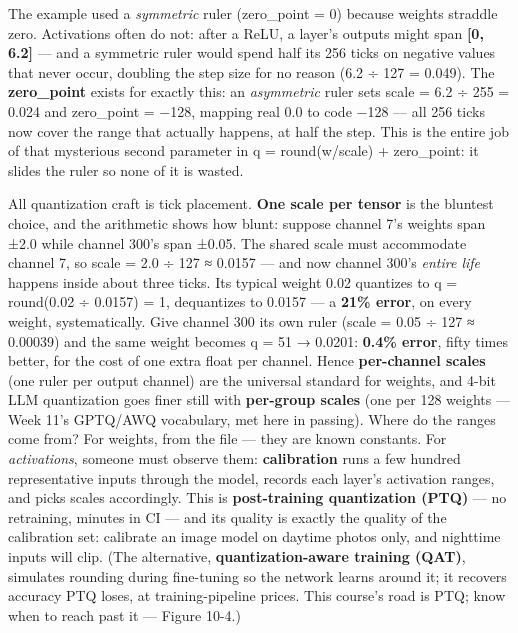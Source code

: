 The example used a \textit{symmetric} ruler (zero\_point = 0) because weights straddle zero. Activations often do not: after a ReLU, a layer's outputs might span \textbf{[0, 6.2]} — and a symmetric ruler would spend half its 256 ticks on negative values that never occur, doubling the step size for no reason (6.2 ÷ 127 = 0.049). The \textbf{zero\_point} exists for exactly this: an \textit{asymmetric} ruler sets scale = 6.2 ÷ 255 = 0.024 and zero\_point = −128, mapping real 0.0 to code −128 — all 256 ticks now cover the range that actually happens, at half the step. This is the entire job of that mysterious second parameter in q = round(w/scale) + zero\_point: it slides the ruler so none of it is wasted.

All quantization craft is tick placement. \textbf{One scale per tensor} is the bluntest choice, and the arithmetic shows how blunt: suppose channel 7's weights span ±2.0 while channel 300's span ±0.05. The shared scale must accommodate channel 7, so scale = 2.0 ÷ 127 ≈ 0.0157 — and now channel 300's \textit{entire life} happens inside about three ticks. Its typical weight 0.02 quantizes to q = round(0.02 ÷ 0.0157) = 1, dequantizes to 0.0157 — a \textbf{21\% error}, on every weight, systematically. Give channel 300 its own ruler (scale = 0.05 ÷ 127 ≈ 0.00039) and the same weight becomes q = 51 → 0.0201: \textbf{0.4\% error}, fifty times better, for the cost of one extra float per channel. Hence \textbf{per-channel scales} (one ruler per output channel) are the universal standard for weights, and 4-bit LLM quantization goes finer still with \textbf{per-group scales} (one per 128 weights — Week 11's GPTQ/AWQ vocabulary, met here in passing). Where do the ranges come from? For weights, from the file — they are known constants. For \textit{activations}, someone must observe them: \textbf{calibration} runs a few hundred representative inputs through the model, records each layer's activation ranges, and picks scales accordingly. This is \textbf{post-training quantization (PTQ)} — no retraining, minutes in CI — and its quality is exactly the quality of the calibration set: calibrate an image model on daytime photos only, and nighttime inputs will clip. (The alternative, \textbf{quantization-aware training (QAT)}, simulates rounding during fine-tuning so the network learns around it; it recovers accuracy PTQ loses, at training-pipeline prices. This course's road is PTQ; know when to reach past it — Figure 10-4.)

